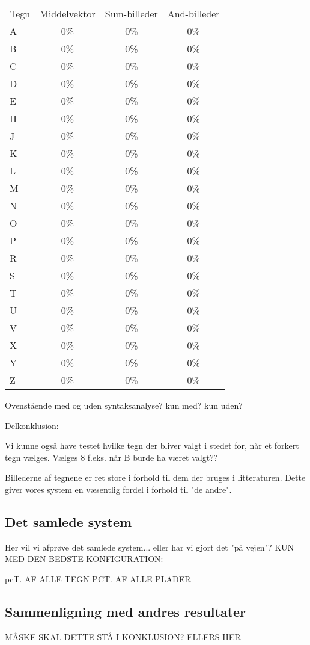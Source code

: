 \begin{tabular}{|l|c|c|c|}\hline
\rowcolor[gray]{0.9} \multicolumn{4}{|>{\columncolor[gray]{0.9}}c|}{\textbf{Kontrolsæt}} \\ \hline
Tegn & Middelvektor & Sum-billeder & And-billeder\\\hline
A & 0\% & 0\% & 0\%\\\hline
B & 0\% & 0\% & 0\%\\\hline
C & 0\% & 0\% & 0\%\\\hline
D & 0\% & 0\% & 0\%\\\hline
E & 0\% & 0\% & 0\%\\\hline
H & 0\% & 0\% & 0\%\\\hline
J & 0\% & 0\% & 0\%\\\hline
K & 0\% & 0\% & 0\%\\\hline 
L & 0\% & 0\% & 0\%\\\hline
M & 0\% & 0\% & 0\%\\\hline
N & 0\% & 0\% & 0\%\\\hline
O & 0\% & 0\% & 0\%\\\hline
P & 0\% & 0\% & 0\%\\\hline
R & 0\% & 0\% & 0\%\\\hline
S & 0\% & 0\% & 0\%\\\hline
T & 0\% & 0\% & 0\%\\\hline
U & 0\% & 0\% & 0\%\\\hline
V & 0\% & 0\% & 0\%\\\hline
X & 0\% & 0\% & 0\%\\\hline
Y & 0\% & 0\% & 0\%\\\hline
Z & 0\% & 0\% & 0\%\\\hline
\end{tabular}

Ovenstående med og uden syntaksanalyse? kun med? kun uden?


Delkonklusion:

Vi kunne også have testet hvilke tegn der bliver valgt i stedet for, når et forkert tegn vælges. Vælges 8 f.eks. når B burde ha været valgt??

Billederne af tegnene er ret store i forhold til dem der bruges i litteraturen. Dette giver vores system en væsentlig fordel i forhold til "de andre".

\subsection{Det samlede system}

Her vil vi afprøve det samlede system... eller har vi gjort det "på vejen"?
KUN MED DEN BEDSTE KONFIGURATION:

pcT. AF ALLE TEGN
PCT. AF ALLE PLADER

\subsection{Sammenligning med andres resultater}

MÅSKE SKAL DETTE STÅ I KONKLUSION? ELLERS HER
